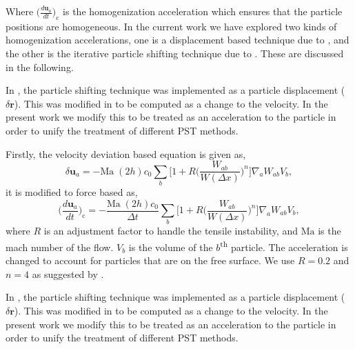 \documentclass[10pt, conference]{FMFP2022}
\newcommand{\ten}[1]{\ensuremath{\mathbf{#1}}}
\begin{document}
Where $\big(\frac{d \ten{u}_a}{dt}\big)_{\text{c}}$ is the homogenization
acceleration which ensures that the particle positions are homogeneous. In the
current work we have explored two kinds of homogenization accelerations, one
is a displacement based technique due to \cite{sun2017deltaplus}, and the
other is the iterative particle shifting technique due to
\cite{huang_kernel_2019}. These are discussed in the following.



In \cite{sun2017deltaplus}, the particle shifting technique was implemented as
a particle displacement ($\delta \ten{r}$). This was modified in
\cite{sun_consistent_2019} to be computed as a change to the velocity. In the
present work we modify this to be treated as an acceleration to the particle
in order to unify the treatment of different PST methods.

Firstly, the velocity deviation based equation is given as,
\begin{equation}
  \label{eq:sun2019_pst}
  \delta \ten{u}_a = - \text{Ma} \; (2h) c_0 \sum_b \bigg[
  1 + R \bigg( \frac{W_{ab}}{W(\Delta x)} \bigg)^n  \bigg] \nabla_a W_{ab} V_b,
\end{equation}
%
it is modified to force based as,
\begin{equation}
  \label{eq:sun2019_pst}
  \bigg(\frac{d \ten{u}_a}{dt}\bigg)_{\text{c}} = - \frac{\text{Ma} \;
    (2h) c_0}{\Delta t} \sum_b \bigg[1 + R \bigg( \frac{W_{ab}}{W(\Delta x)} \bigg)^n
  \bigg] \nabla_a W_{ab} V_b,
\end{equation}
where $R$ is an adjustment factor to handle the tensile instability, and
$\text{Ma}$ is the mach number of the flow. $V_b$ is the volume of the
$b$\textsuperscript{th} particle. The acceleration is changed to account for
particles that are on the free surface. We use $R = 0.2$ and $n = 4$ as
suggested by \cite{sun_consistent_2019}.



In \cite{sun2017deltaplus}, the particle shifting technique was implemented as
a particle displacement ($\delta \ten{r}$). This was modified in
\cite{sun_consistent_2019} to be computed as a change to the velocity. In the
present work we modify this to be treated as an acceleration to the particle
in order to unify the treatment of different PST methods.
\end{document}

